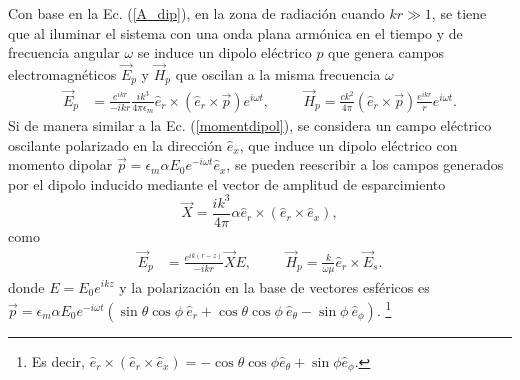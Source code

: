 \noindent Con base en la Ec. (\ref{A_dip}), en la zona de radiación cuando $kr\gg 1$, se tiene que al iluminar el sistema con una onda plana armónica en el tiempo y de frecuencia angular $\omega$ se induce un dipolo eléctrico $p$ que genera campos electromagnéticos $\Vec{E}_p$ y $\Vec{H}_p$ que oscilan a la misma frecuencia $\omega$ 
\begin{align}
    \Vec{E}_p&=\frac{e^{ikr}}{-ikr}\frac{ik^3}{4\pi\epsilon_m}\hat{e}_r\times(\hat{e}_r\times \Vec{p}) e^{i\omega t}, \hspace{1cm}
    \Vec{H}_p=\frac{ck^2}{4\pi}(\hat{e}_r\times\Vec{p})\frac{e^{ikr}}{r}e^{i\omega t}.
\end{align}
Si de manera similar a la Ec. (\ref{momentdipol}), se considera un campo eléctrico oscilante polarizado en la dirección $\hat{e}_x$, que induce un dipolo eléctrico con momento dipolar  $\Vec{p}=\epsilon_m \alpha E_0 e^{-i\omega t}\hat{e}_x$, se pueden reescribir a los campos generados por el dipolo inducido mediante el vector de amplitud de esparcimiento
\begin{equation}
	\Vec{X}=\frac{ik^3}{4\pi}\alpha \hat{e}_r\times(\hat{e}_r\times \hat{e}_x),
	\label{Xvec}
\end{equation}
como
 \begin{align}
 	\Vec{E}_{p}&=\frac{e^{ik(r-z)}}{-ikr}\Vec{X}E,
 	\hspace{1cm}
 	\Vec{H}_{p}=\frac{k}{\omega\mu}\hat{e}_r\times\Vec{E}_{s}.
 	\label{EH_s}
 \end{align}
donde $E=E_0 e^{ikz}$ y la polarización en la base de vectores esféricos es $\Vec{p}=\epsilon_m \alpha E_0 e^{-i\omega t}(\sin\theta\cos\phi\: \hat{e}_r+\cos\theta\cos\phi\: \hat{e}_{\theta}-\sin\phi \:\hat{e}_{\phi})$. \footnote{Es decir, $\hat{e}_r\times(\hat{e}_r\times \hat{e}_x)=-\cos\theta\cos\phi \hat{e}_{\theta}+\sin\phi \hat{e}_{\phi}$. } \\

